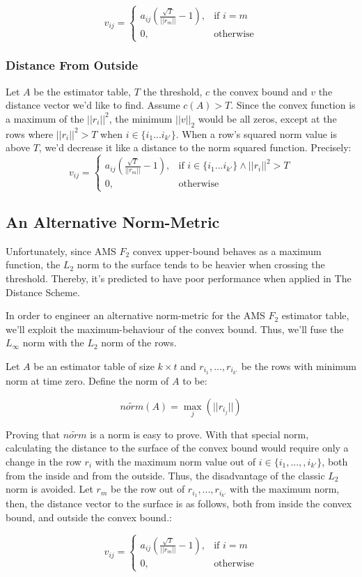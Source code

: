 \documentclass[11pt, conference]{IEEEtran}
\begin{document}
\[
    v_{ij}= 
\begin{cases}
    a_{ij} (\frac{\sqrt{T}}{||r_m||}-1),& \text{if } i = m \\
    0,                                  & \text{otherwise}
\end{cases}
\]


		\subsubsection{Distance From Outside}

Let $A$ be the estimator table, $T$ the threshold, $c$ the convex bound and $v$ the distance vector we'd like to find. Assume ${c(A) > T}$. Since the convex function is a maximum of the $||r_i||^2$, the minimum $||v||_2$ would be all zeros, except at the rows where $||r_i||^2 > T$ when ${i \in \{i_1 ... i_{k'}\}}$. When a row's squared norm value is above $T$, we'd decrease it like a distance to the norm squared function. Precisely:
\[
    v_{ij}= 
\begin{cases}
    a_{ij} (\frac{\sqrt{T}}{||r_m||}-1),& \text{if } i \in \{i_1 ... i_{k'}\} \wedge ||r_i||^2 > T  \\
    0,                                  & \text{otherwise}
\end{cases}
\]


	\subsection{An Alternative Norm-Metric}

Unfortunately, since AMS $F_2$ convex upper-bound behaves as a maximum function, the $L_2$ norm to the surface tends to be heavier when crossing the threshold. Thereby, it's predicted to have poor performance when applied in The Distance Scheme.

In order to engineer an alternative norm-metric for the AMS $F_2$ estimator table, we'll exploit the maximum-behaviour of the convex bound. Thus, we'll fuse the $L_\infty$ norm with the $L_2$ norm of the rows.

Let $A$ be an estimator table of size $k \times t$ and ${r_{i_1},...,r_{i_{k'}}}$ be the rows with minimum norm at time zero. Define the norm of $A$ to be:

$$\widetilde{norm}(A) = \max\limits_{j} {(||r_{i_j}||)}$$

Proving that $\widetilde{norm}$ is a norm is easy to prove. With that special norm, calculating the distance to the surface of the convex bound would require only a change in the row $r_i$ with the maximum norm value out of $i \in \{i_1,...,,i_{k'}\}$, both from the inside and from the outside. Thus, the disadvantage of the classic $L_2$ norm is avoided. Let  $r_m$ be the row out of ${r_{i_1},...,r_{i_{k'}}}$ with the maximum norm, then, the distance vector to the surface is as follows, both from inside the convex bound, and outside the convex bound.:

\[
    v_{ij}= 
\begin{cases}
    a_{ij} (\frac{\sqrt{T}}{||r_m||}-1),& \text{if } i = m \\
    0,                                  & \text{otherwise}
\end{cases}
\]

	{}
	
\end{document}
